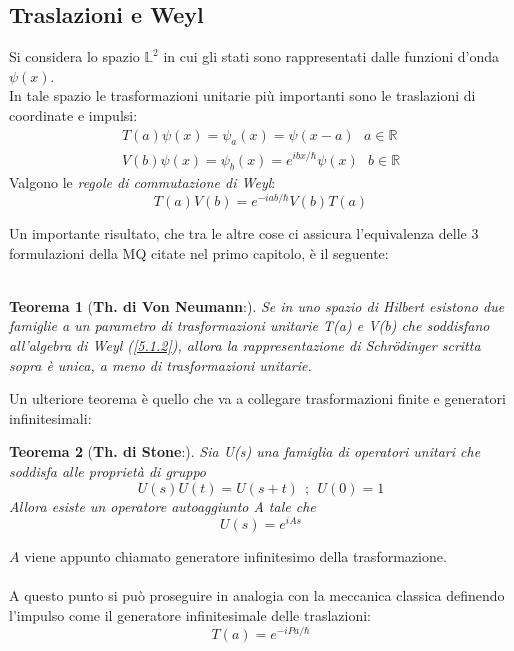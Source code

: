\documentclass[twoside]{article}
\newtheorem{theorem}{Teorema}[section]
\begin{document}
\subsection{Traslazioni e Weyl}
Si considera lo spazio $\mathds{L}^2$
in cui gli stati sono rappresentati dalle funzioni d'onda $\psi(x)$.
\\
In tale spazio le trasformazioni unitarie più importanti sono le traslazioni di coordinate e impulsi:
\begin{equation} \begin{split}
     T(a)\psi(x)=\psi_a (x)=\psi(x-a) \ \ \ a \in \mathds{R} \\
     V(b)\psi(x)=\psi_b  (x)=e^{ibx/\hbar}\psi(x) \ \ \ b \in \mathds{R}
\end{split} \end{equation}
Valgono le \textit{regole di commutazione di Weyl}:
\begin{equation} \label{5.1.2}
    T(a)V(b)=e^{-iab/\hbar}V(b)T(a)
\end{equation}


Un importante risultato, che tra le altre cose ci assicura l'equivalenza delle 3 formulazioni della MQ citate nel primo capitolo, è il seguente:
\\
\\
\begin{theorem}[\textbf{Th. di Von Neumann}:]Se in uno spazio di Hilbert
esistono due famiglie a un parametro di trasformazioni
unitarie T(a) e V(b) che soddisfano all’algebra di Weyl
(\ref{5.1.2}), allora la rappresentazione di Schr\"odinger scritta
sopra è unica, a meno di trasformazioni unitarie.
\end{theorem}

Un ulteriore teorema è quello che va a collegare trasformazioni finite e generatori infinitesimali:

\begin{theorem}[\textbf{Th. di Stone}:] \label{Stone}
Sia U(s) una famiglia di operatori
unitari che soddisfa alle proprietà di gruppo
\begin{equation*}
U(s)U(t) = U(s + t) \ \ ; \ \  U(0) = 1
\end{equation*}
Allora esiste un operatore autoaggiunto A tale che
\begin{equation*}
U(s) = e^{iA s}
\end{equation*}
\end{theorem}
$A$ viene appunto chiamato generatore infinitesimo della trasformazione.
\\
\\
A questo punto si può proseguire in analogia con la meccanica classica definendo l'impulso come il generatore infinitesimale delle traslazioni:
\begin{equation}
    T(a)=e^{-iPa/\hbar}
\end{equation}
\end{document}
